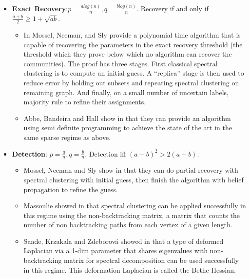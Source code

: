 \begin{itemize}
    \item \textbf{Exact Recovery}:$p=\frac{alog(n)}{n}, q = \frac{b log(n)}{n}$.  Recovery if and only if $\frac{a+b}{2} \geq 1 + \sqrt{ab}$.
    \begin{itemize}
        \item In \cite{MNS} Mossel, Neeman, and Sly provide a polynomial time algorithm that is capable of recovering the parameters in the exact recovery threshold (the threshold which they prove below which no algorithm can recover the communities).  The proof has three stages. First classical spectral clustering is to compute an initial guess. A “replica” stage is then used to reduce error by holding out subsets and repeating spectral clustering on remaining graph.  And finally, on a small number of uncertain labels, majority rule to refine their assignments. 
         \item Abbe, Bandeira and Hall show in \cite{ABH} that they can provide an algorithm using semi definite programming to achieve the state of the art in the same sparse regime as above. 
    \end{itemize}
    \item \textbf{Detection}: $p = \frac{a}{n}, q = \frac{b}{n}$.  Detection iff $(a-b)^2 > 2(a+b)$.
    \begin{itemize}
        \item Mossel, Neeman and Sly show in \cite{MNS_sparse} that they can do partial recovery with spectral clustering with initial guess, then finish the algorithm with belief propagation to refine the guess.  \\
        \item Massoulie showed in \cite{Massouli} that spectral clustering can be applied successfully in this regime using the non-backtracking matrix, a matrix that counts the number of non backtracking paths from each vertex of a given length.   \\
        \item Saade, Krzakala and Zdeborová showed in \cite{AFL} that a type of deformed Laplacian via a 1-dim parameter that shares eigenvalues with non-backtracking matrix for spectral decomposition can be used successfully in this regime.  This deformation Laplacian is called the Bethe Hessian.    
    \end{itemize}
   \end{itemize}
   
